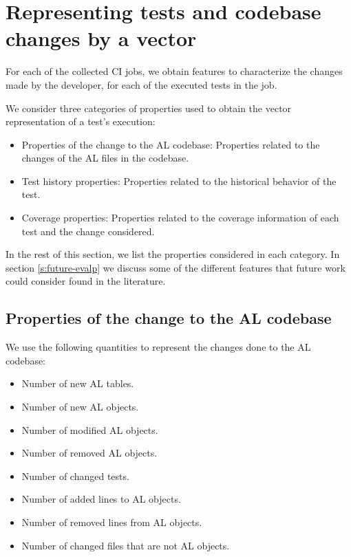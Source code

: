 \section{Representing tests and codebase changes by a vector}\label{s:method-characterizing-testruns}

For each of the collected CI jobs, we obtain features to characterize
the changes made by the developer, for each of the executed tests in the job.

We consider three categories of properties used to obtain the vector
representation of a test's execution:
\begin{itemize}
    \item Properties of the change to the AL codebase: Properties related to the changes of the AL files in the codebase.
    \item Test history properties: Properties related to the historical behavior of the test.
    \item Coverage properties: Properties related to the coverage information of each test and the change considered.
\end{itemize}

In the rest of this section, we list the properties considered in each category.
In section \ref{s:future-evalp} we discuss some of the different features that 
future work could consider found in the literature.

\subsection{Properties of the change to the AL codebase}

We use the following quantities to represent the changes done to the
AL codebase:

\begin{itemize}
    \item Number of new AL tables.
    \item Number of new AL objects.
    \item Number of modified AL objects.
    \item Number of removed AL objects.
    \item Number of changed tests.
    \item Number of added lines to AL objects.
    \item Number of removed lines from AL objects.
    \item Number of changed files that are not AL objects.
\end{itemize}

